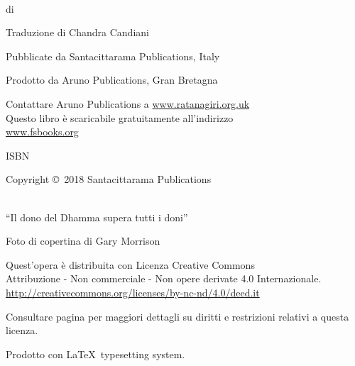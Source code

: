 \cleartoverso
\thispagestyle{empty}
\enlargethispage{\baselineskip}

{\copyrightsize\setlength{\parskip}{0.5\baselineskip}\setlength{\parindent}{0em}%
\raggedright%
\shaker\color[gray]{0.3}

\thetitle\\
di \theauthor

Traduzione di Chandra Candiani

Pubblicate da Santacittarama Publications, Italy

Prodotto da Aruno Publications, Gran Bretagna

Contattare Aruno Publications a \href{http://ratanagiri.org.uk/}{www.ratanagiri.org.uk}\\
Questo libro \`{e} scaricabile gratuitamente all'indirizzo\\
\href{http://fsbooks.org/}{www.fsbooks.org}

ISBN \theISBN

Copyright \copyright\ 2018 Santacittarama Publications

\\
``Il dono del Dhamma supera tutti i doni''

Foto di copertina di Gary Morrison

{\tiny
Quest'opera è distribuita con Licenza Creative Commons\\
Attribuzione - Non commerciale - Non opere derivate 4.0 Internazionale.\\
\href{http://creativecommons.org/licenses/by-nc-nd/4.0/deed.it}{http://creativecommons.org/licenses/by-nc-nd/4.0/deed.it}

Consultare pagina \pageref{copyright-details} per maggiori dettagli su diritti e restrizioni relativi a questa licenza.

Prodotto con \LaTeX\ typesetting system.

\theEditionInfo

}}

